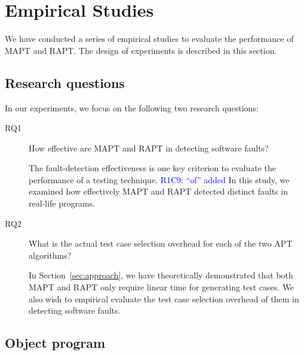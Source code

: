 \documentclass[10pt,journal,compsoc]{IEEEtran}
\begin{document}
\section{Empirical Studies}
\label{sec:exp}

We have conducted a series of empirical studies to evaluate the performance of MAPT and RAPT. The design of experiments is described in this section.

\subsection{Research questions}

In our experiments, we focus on the following two research questions:

\begin{description}
\item [RQ1] How effective are MAPT and RAPT in detecting software faults?

The fault-detection effectiveness is one key criterion to evaluate the performance of a testing technique. \textcolor{blue}{R1C9: ``of'' added} In this study, we examined how effectively MAPT and RAPT detected distinct faults in real-life programs.
\item [RQ2] What is the actual test case selection overhead for each of the two APT algorithms?

In Section~\ref{sec:approach}, we have theoretically demonstrated that both MAPT and RAPT only require linear time for generating test cases. We also wish to empirical evaluate the test case selection overhead of them in detecting software faults.
\end{description}

\subsection{Object program}
\end{document}

